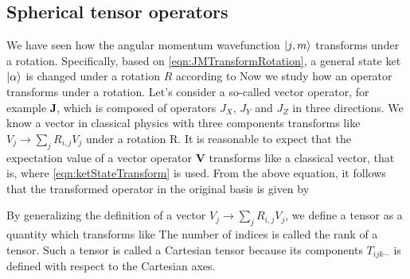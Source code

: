 \subsection{Spherical tensor operators}

We have seen how the angular momentum wavefunction $| j, m \rangle$ transforms under a rotation.  Specifically, based 
on  \autoref{eqn:JMTransformRotation}, a general state ket $| \alpha \rangle$ is changed under a rotation $R$ according to
Now we study how an operator transforms under a rotation. Let's consider 
a so-called vector operator, for example $\mathbf{J}$, which is composed of operators $J_X$, $J_Y$ and $J_Z$
in three directions. We know a vector in classical physics with three components transforms like $V_j \rightarrow \sum_{j} R_{i, j} V_j$ under a rotation R. It is reasonable to expect that the expectation value of a vector operator 
$\mathbf{V}$ transforms like a classical vector, that is,
where \autoref{eqn:ketStateTransform} is used. From the above equation, it follows that the transformed operator in
the original basis is given by

By generalizing the definition of a vector $V_j \rightarrow \sum_{j} R_{i, j} V_j$, we define a tensor as a quantity which
transforms like
The number of indices is called the rank of a tensor. Such a tensor is called a Cartesian tensor because its components
$T_{ijk \cdots }$ is defined with respect to the Cartesian axes. 

